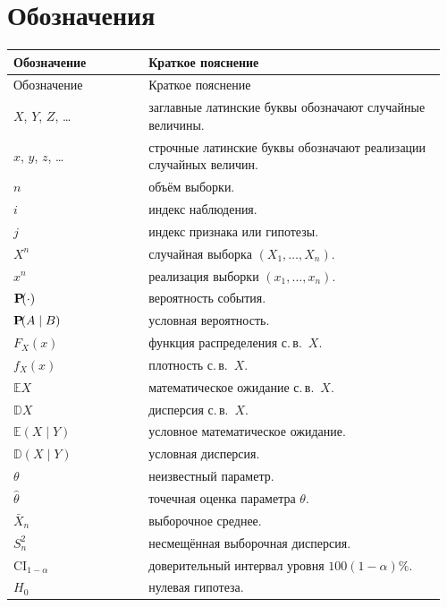 \chapter*{Обозначения}

{\footnotesize
\setlength{\tabcolsep}{4pt}
\setlength{\extrarowheight}{2pt}
\begin{longtable}{@{}>{\raggedright\arraybackslash}p{0.30\linewidth}>{\raggedright\arraybackslash}p{0.66\linewidth}@{}}
\toprule
Обозначение & Краткое пояснение \\
\midrule
\endfirsthead
\toprule
Обозначение & Краткое пояснение \\
\midrule
\endhead
\midrule
\endfoot
\bottomrule
\endlastfoot
$X$, $Y$, $Z$, \ldots & заглавные латинские буквы обозначают случайные величины. \\
$x$, $y$, $z$, \ldots & строчные латинские буквы обозначают реализации случайных величин. \\
$n$ & объём выборки. \\
$i$ & индекс наблюдения. \\
$j$ & индекс признака или гипотезы. \\
$X^n$ & случайная выборка $(X_1,\ldots,X_n)$. \\
$x^n$ & реализация выборки $(x_1,\ldots,x_n)$. \\
$\operatorname{\mathbf{P}\!}(\cdot)$ & вероятность события. \\
$\operatorname{\mathbf{P}\!}(A\mid B)$ & условная вероятность. \\
$F_X(x)$ & функция распределения с.\,в.~$X$. \\
$f_X(x)$ & плотность с.\,в.~$X$. \\
$\mathbb{E}X$ & математическое ожидание с.\,в.~$X$. \\
$\mathbb{D}X$ & дисперсия с.\,в.~$X$. \\
$\mathbb{E}(X\mid Y)$ & условное математическое ожидание. \\
$\mathbb{D}(X\mid Y)$ & условная дисперсия. \\
$\theta$ & неизвестный параметр. \\
$\hat\theta$ & точечная оценка параметра $\theta$. \\
$\bar X_n$ & выборочное среднее. \\
$S_n^2$ & несмещённая выборочная дисперсия. \\
$\mathrm{CI}_{1-\alpha}$ & доверительный интервал уровня $100(1-\alpha)\%$. \\
$H_0$ & нулевая гипотеза. \\

\end{longtable}}
